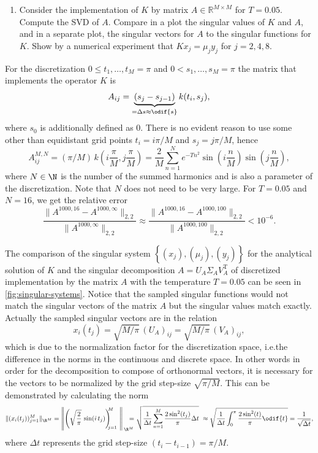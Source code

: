 \nopagebreak
\noindent\hrulefill

\begin{enumerate}[resume, label=(\alph*)]
  \item Consider the implementation of $K$ by matrix $A \in \mathbb{R}^{M \times M}$ for $T = 0.05$. Compute the SVD of
      $A$. Compare in a plot the singular values of $K$ and $A$, and in a separate plot, the singular vectors for $A$ to
      the singular functions for $K$. Show by a numerical experiment that $Kx_j = \mu_j y_j$ for $j = 2, 4, 8$.
\end{enumerate}

\nopagebreak
\noindent\hrulefill
\pagebreak

For the discretization \(0 \le t_1, \ldots, t_M = \pi\) and \(0 < s_1, \ldots, s_M = \pi\) the matrix that implements the
    operator \(K\) is \[
        A_{ij} =  \underbrace{(s_j - s_{j - 1})}_{= \Delta s \approx \odif{s}}k(t_i, s_j),
    \] where \(s_0\) is additionally defined as \(0\).
There is no evident reason to use some other than equidistant grid points \(t_i = i\pi/M\) and \(s_j = j\pi/M\), hence
\[
    A_{ij}^{M,N} = (\pi/M)\, k\!\left(i \frac{\pi}{M}, j \frac{\pi}{M}\right)
    = \frac{2}{M} \sum_{n
    = 1}^{N} e^{-Tn^2} \sin \left( i\frac{n}{M} \right) \sin \left( j\frac{n}{M} \right),
    \] where \(N \in \N\) is the number of the summed harmonics and is also a parameter of the discretization.
Note that  \(N\) does not need to be very large.
For \(T = 0.05\) and \(N = 16\), we get the relative error \[
    \frac{\|A^{1000,16} - A^{1000, \infty}\|_{2,2}}{\|A^{1000, \infty}\|_{2,2}} \approx \frac{\|A^{1000, 16} - A^{1000,
    100}\|_{2,2}}{\|A^{1000, 100}\|_{2,2}}  < 10^{-6}.
\] 

The comparison of the singular system \({\left\{ (x_j), (\mu_j), (y_j) \right\}}\) for the analytical solution of \(K\)
    and the singular decomposition \(A = U_{A}\Sigma_{A}V_{A}^{\mathrm{T}}\) of discretized implementation by the matrix
    \(A\) with the temperature \(T = 0.05\) can be seen in \cref{fig:singular-systems}.
Notice that the sampled singular functions would not match the singular vectors of the matrix \(A\) but the singular
    values match exactly.
Actually the sampled singular vectors are in the relation
\[
    x_i(t_j) = \sqrt{M/\pi} \, (U_{A})_{ij} = \sqrt{M/\pi} \, (V_{A})_{ij},
\] 
    which is due to the normalization factor for the discretization space, i.e.\@ the difference in the norms in the
    continuous and discrete space.
In other words in order for the decomposition to compose of orthonormal vectors, it is necessary for the vectors to be
    normalized by the grid step-size \(\sqrt{\pi/M}\).
This can be demonstrated by calculating the norm \[
    \|(x_i(t_j))_{j = 1}^{M}\|_{\R^M} =
    \left\|\left(\sqrt{\frac{2}{\pi}}\,\sin(i\,t_j)\right)_{\!\!\!j = 1}^{\!\!\!M}\,\,\right\|_{\,\R^M}
    \!\!\!\!\!\!= \sqrt{\frac{1}{\Delta t} \sum_{n = 1}^{M}\frac{2\sin^2(t_j)}{\pi} \Delta t}
    \,\,\approx \sqrt{\frac{1}{\Delta t} \int_{0}^{\pi} \frac{2\sin^2(t)}{\pi} \odif{t}} = \frac{1}{\sqrt{\Delta t}},
    \] where \(\Delta t\) represents the grid step-size \((t_{i} - t_{i - 1}) = \pi/M\).

